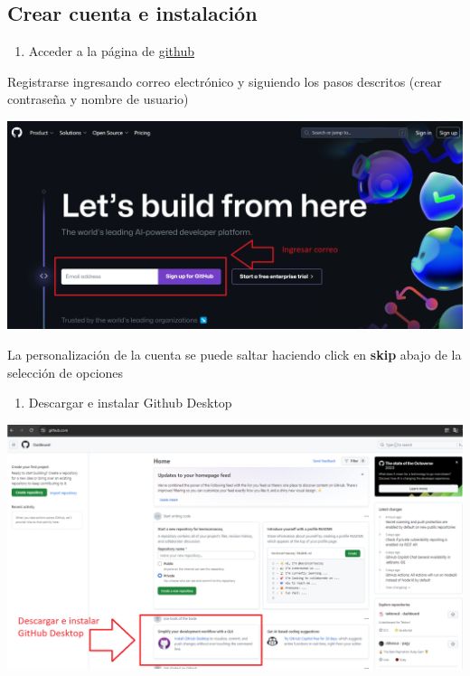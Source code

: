 \documentclass[
  letterpaper,
  DIV=11,
  numbers=noendperiod]{scrartcl}
\providecommand{\tightlist}{%
  \setlength{\itemsep}{0pt}\setlength{\parskip}{0pt}}\usepackage{longtable,booktabs,array}
\begin{document}
\subsection{Crear cuenta e
instalación}\label{crear-cuenta-e-instalaciuxf3n}

\begin{enumerate}
\def\labelenumi{\arabic{enumi}.}
\tightlist
\item
  Acceder a la página de \href{https://github.com/}{github}
\end{enumerate}

Registrarse ingresando correo electrónico y siguiendo los pasos
descritos (crear contraseña y nombre de usuario)

\includegraphics{images/github1.png}

La personalización de la cuenta se puede saltar haciendo click en
\textbf{skip} abajo de la selección de opciones

\begin{enumerate}
\def\labelenumi{\arabic{enumi}.}
\setcounter{enumi}{1}
\tightlist
\item
  Descargar e instalar Github Desktop
\end{enumerate}

\includegraphics{images/github2.png}
\end{document}

